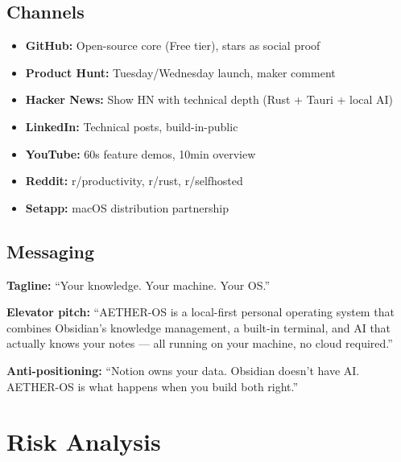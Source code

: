 \documentclass[11pt,a4paper]{article}
\begin{document}
\subsection{Channels}

\begin{itemize}[noitemsep]
  \item \textbf{GitHub:} Open-source core (Free tier), stars as social proof
  \item \textbf{Product Hunt:} Tuesday/Wednesday launch, maker comment
  \item \textbf{Hacker News:} Show HN with technical depth (Rust + Tauri + local AI)
  \item \textbf{LinkedIn:} Technical posts, build-in-public
  \item \textbf{YouTube:} 60s feature demos, 10min overview
  \item \textbf{Reddit:} r/productivity, r/rust, r/selfhosted
  \item \textbf{Setapp:} macOS distribution partnership
\end{itemize}

\subsection{Messaging}

\textbf{Tagline:} ``Your knowledge. Your machine. Your OS.''

\textbf{Elevator pitch:} ``AETHER-OS is a local-first personal operating system that combines Obsidian's knowledge management, a built-in terminal, and AI that actually knows your notes --- all running on your machine, no cloud required.''

\textbf{Anti-positioning:} ``Notion owns your data. Obsidian doesn't have AI. AETHER-OS is what happens when you build both right.''

\section{Risk Analysis}
\end{document}
